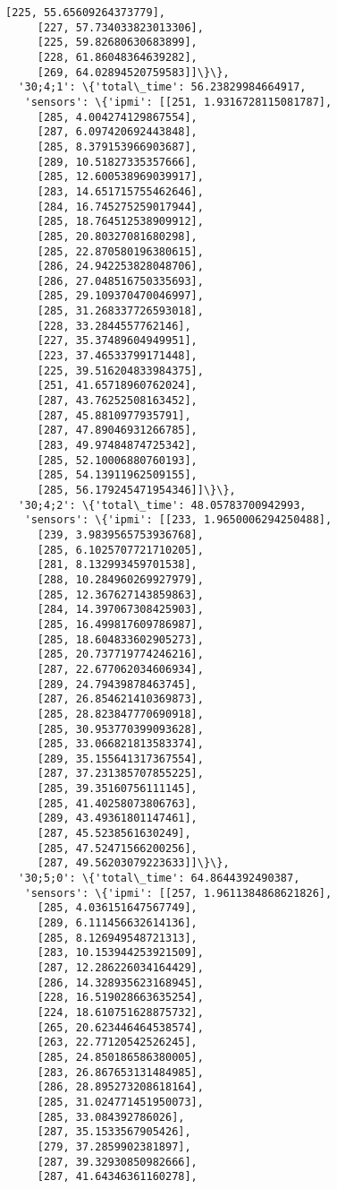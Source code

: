 \documentclass[11pt]{article}
\begin{document}
\begin{tcolorbox}[breakable, size=fbox, boxrule=.5pt, pad at break*=1mm, opacityfill=0]
\begin{Verbatim}[commandchars=\\\{\}]
     [225, 55.65609264373779],
     [227, 57.734033823013306],
     [225, 59.82680630683899],
     [228, 61.86048364639282],
     [269, 64.02894520759583]]\}\},
  '30;4;1': \{'total\_time': 56.23829984664917,
   'sensors': \{'ipmi': [[251, 1.9316728115081787],
     [285, 4.004274129867554],
     [287, 6.097420692443848],
     [285, 8.379153966903687],
     [289, 10.51827335357666],
     [285, 12.600538969039917],
     [283, 14.651715755462646],
     [284, 16.745275259017944],
     [285, 18.764512538909912],
     [285, 20.80327081680298],
     [285, 22.870580196380615],
     [286, 24.942253828048706],
     [286, 27.048516750335693],
     [285, 29.109370470046997],
     [285, 31.268337726593018],
     [228, 33.2844557762146],
     [227, 35.37489604949951],
     [223, 37.46533799171448],
     [225, 39.516204833984375],
     [251, 41.65718960762024],
     [287, 43.76252508163452],
     [287, 45.8810977935791],
     [287, 47.89046931266785],
     [283, 49.97484874725342],
     [285, 52.10006880760193],
     [285, 54.13911962509155],
     [285, 56.179245471954346]]\}\},
  '30;4;2': \{'total\_time': 48.05783700942993,
   'sensors': \{'ipmi': [[233, 1.9650006294250488],
     [239, 3.9839565753936768],
     [285, 6.1025707721710205],
     [281, 8.132993459701538],
     [288, 10.284960269927979],
     [285, 12.367627143859863],
     [284, 14.397067308425903],
     [285, 16.499817609786987],
     [285, 18.604833602905273],
     [285, 20.737719774246216],
     [287, 22.677062034606934],
     [289, 24.79439878463745],
     [287, 26.854621410369873],
     [285, 28.823847770690918],
     [285, 30.953770399093628],
     [285, 33.066821813583374],
     [289, 35.155641317367554],
     [287, 37.231385707855225],
     [285, 39.35160756111145],
     [285, 41.40258073806763],
     [289, 43.49361801147461],
     [287, 45.5238561630249],
     [285, 47.52471566200256],
     [287, 49.56203079223633]]\}\},
  '30;5;0': \{'total\_time': 64.8644392490387,
   'sensors': \{'ipmi': [[257, 1.9611384868621826],
     [285, 4.036151647567749],
     [289, 6.111456632614136],
     [285, 8.126949548721313],
     [283, 10.153944253921509],
     [287, 12.286226034164429],
     [286, 14.328935623168945],
     [228, 16.519028663635254],
     [224, 18.610751628875732],
     [265, 20.623446464538574],
     [263, 22.77120542526245],
     [285, 24.850186586380005],
     [283, 26.867653131484985],
     [286, 28.895273208618164],
     [285, 31.024771451950073],
     [285, 33.084392786026],
     [287, 35.1533567905426],
     [279, 37.2859902381897],
     [287, 39.32930850982666],
     [287, 41.64346361160278],

\end{Verbatim}
\end{tcolorbox}
\end{document}
